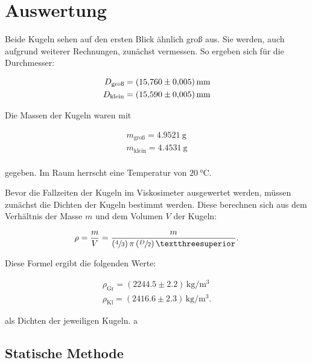 %

%
\section{Auswertung}
\label{sec:Auswertung}

Beide Kugeln sehen auf den ersten Blick ähnlich groß aus. Sie werden, auch aufgrund weiterer Rechnungen, zunächst 
vermessen. So ergeben sich für die Durchmesser:

\begin{align*}
    D_\text{groß} = \qty{15.760 +- 0.005}{\milli \meter} \\
    D_\text{klein} = \qty{15.590 +- 0.005}{\milli \meter} \\
\end{align*}

\noindent
Die Massen der Kugeln waren mit

\begin{align*}
    m_\text{groß} = \qty{4.9521}{\gram} \\
    m_\text{klein} = \qty{4.4531}{\gram} \\
\end{align*}

\noindent
gegeben.
Im Raum herrscht eine Temperatur von $\qty{20}{\celsius}$. 

\noindent Bevor die Fallzeiten der Kugeln im Viskosimeter ausgewertet werden, müssen zunächst die Dichten der Kugeln 
bestimmt werden. Diese berechnen sich aus dem Verhältnis der Masse $m$ und dem Volumen $V$ der Kugeln:

\begin{equation*}
    \rho = \frac{m}{V} = \frac{m}{\left(\sfrac{4}{3}\right)\pi\left(\sfrac{D}{2}\right)³}.
\end{equation*}

\noindent Diese Formel ergibt die folgenden Werte:

\begin{gather*}
    \rho_\text{Gr} = \left(2244.5 \pm 2.2\right)\,\unit{\kilo\gram\per\cubic\meter} \\
    \rho_\text{Kl} = \left(2416.6 \pm 2.3\right)\,\unit{\kilo\gram\per\cubic\meter}.
\end{gather*}

\noindent als Dichten der jeweiligen Kugeln.
a
\subsection{Statische Methode}

